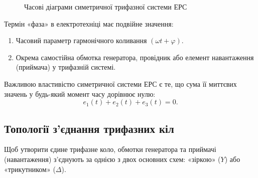 \begin{figure}[h!]
	\centering
	\caption{Часові діаграми симетричної трифазної системи ЕРС}
	\label{pic:ThreePhaseWaveforms}
\end{figure}

Термін «фаза» в електротехніці має подвійне значення:
\begin{enumerate}
    \item Часовий параметр гармонічного коливання $(\omega t + \varphi)$.
    \item Окрема самостійна обмотка генератора, провідник або елемент навантаження (приймача) у трифазній системі.
\end{enumerate}

Важливою властивістю симетричної системи ЕРС є те, що сума її миттєвих значень у будь-який момент часу дорівнює нулю:
\begin{equation}
	e_1(t) + e_2(t) + e_3(t) = 0.
\end{equation}

\subsection*{Топології з'єднання трифазних кіл}

Щоб утворити єдине трифазне коло, обмотки генератора та приймачі (навантаження) з'єднують за однією з двох основних схем: «зіркою» ($Y$) або «трикутником» ($\Delta$).

